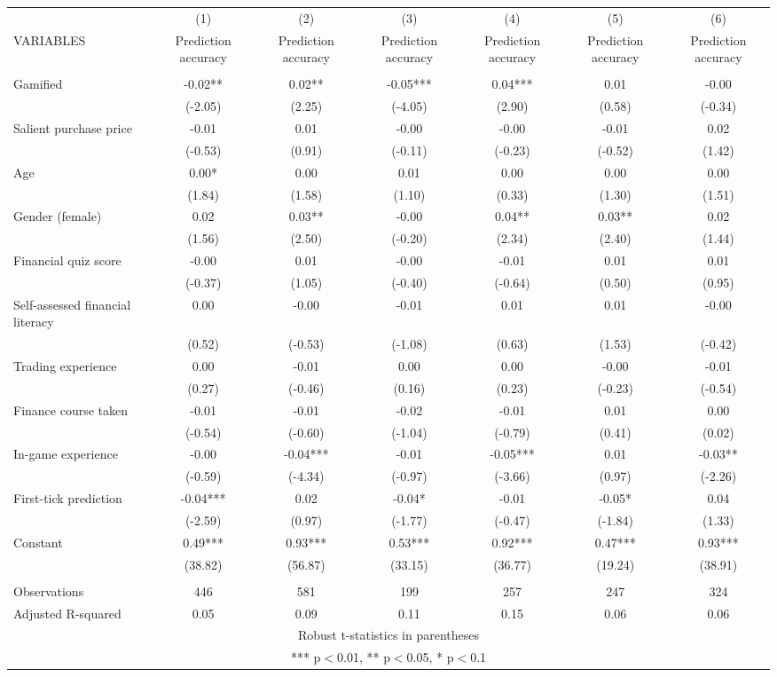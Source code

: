 \documentclass[]{article}
\begin{document}
\begin{tabular}{lcccccc} \hline
 & (1) & (2) & (3) & (4) & (5) & (6) \\
VARIABLES & Prediction accuracy & Prediction accuracy & Prediction accuracy & Prediction accuracy & Prediction accuracy & Prediction accuracy \\ \hline
 &  &  &  &  &  &  \\
Gamified & -0.02** & 0.02** & -0.05*** & 0.04*** & 0.01 & -0.00 \\
 & (-2.05) & (2.25) & (-4.05) & (2.90) & (0.58) & (-0.34) \\
Salient purchase price & -0.01 & 0.01 & -0.00 & -0.00 & -0.01 & 0.02 \\
 & (-0.53) & (0.91) & (-0.11) & (-0.23) & (-0.52) & (1.42) \\
Age & 0.00* & 0.00 & 0.01 & 0.00 & 0.00 & 0.00 \\
 & (1.84) & (1.58) & (1.10) & (0.33) & (1.30) & (1.51) \\
Gender (female) & 0.02 & 0.03** & -0.00 & 0.04** & 0.03** & 0.02 \\
 & (1.56) & (2.50) & (-0.20) & (2.34) & (2.40) & (1.44) \\
Financial quiz score & -0.00 & 0.01 & -0.00 & -0.01 & 0.01 & 0.01 \\
 & (-0.37) & (1.05) & (-0.40) & (-0.64) & (0.50) & (0.95) \\
Self-assessed financial literacy & 0.00 & -0.00 & -0.01 & 0.01 & 0.01 & -0.00 \\
 & (0.52) & (-0.53) & (-1.08) & (0.63) & (1.53) & (-0.42) \\
Trading experience & 0.00 & -0.01 & 0.00 & 0.00 & -0.00 & -0.01 \\
 & (0.27) & (-0.46) & (0.16) & (0.23) & (-0.23) & (-0.54) \\
Finance course taken & -0.01 & -0.01 & -0.02 & -0.01 & 0.01 & 0.00 \\
 & (-0.54) & (-0.60) & (-1.04) & (-0.79) & (0.41) & (0.02) \\
In-game experience & -0.00 & -0.04*** & -0.01 & -0.05*** & 0.01 & -0.03** \\
 & (-0.59) & (-4.34) & (-0.97) & (-3.66) & (0.97) & (-2.26) \\
First-tick prediction & -0.04*** & 0.02 & -0.04* & -0.01 & -0.05* & 0.04 \\
 & (-2.59) & (0.97) & (-1.77) & (-0.47) & (-1.84) & (1.33) \\
Constant & 0.49*** & 0.93*** & 0.53*** & 0.92*** & 0.47*** & 0.93*** \\
 & (38.82) & (56.87) & (33.15) & (36.77) & (19.24) & (38.91) \\
 &  &  &  &  &  &  \\
Observations & 446 & 581 & 199 & 257 & 247 & 324 \\
 Adjusted R-squared & 0.05 & 0.09 & 0.11 & 0.15 & 0.06 & 0.06 \\ \hline
\multicolumn{7}{c}{ Robust t-statistics in parentheses} \\
\multicolumn{7}{c}{ *** p$<$0.01, ** p$<$0.05, * p$<$0.1} \\
\end{tabular}
\end{document}
